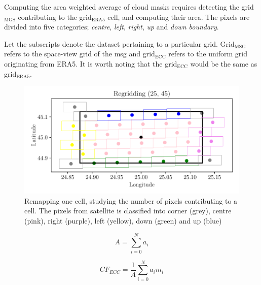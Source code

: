 Computing the area weighted average of cloud masks requires detecting the grid$_{\text{MGS}}$ contributing to the grid$_{\text{ERA5}}$ cell, and computing their area. The pixels are divided into five categories; \textit{centre}, \textit{left}, \textit{right}, \textit{up} and \textit{down boundary}. 

Let the subscripts denote the dataset pertaining to a particular grid. Grid$_{\text{MSG}}$ refers to the space-view grid of the \acrlong{msg} and grid$_{\text{ECC}}$ refers to the uniform grid originating from ERA5. It is worth noting that the grid$_{\text{ECC}}$ would be the same as grid$_{\text{ERA5}}$.
\begin{figure}
    \centering
    \includegraphics{python_figs/example_remapping_lat45_lon25.pdf}
    \caption{Remapping one cell, studying the number of pixels contributing to a cell. The pixels from satellite is classified into corner (grey), centre (pink), right (purple), left (yellow), down (green) and up (blue) } 
    \label{fig:pixels_contributing_to_cell.}
\end{figure}

\begin{equation} \label{eq:tot_area}
    A = \sum_{i=0}^{N} a_i
\end{equation}

\begin{equation} \label{eq:area_weighting}
    CF_{ECC} = \frac{1}{A} \sum_{i=0}^{N} a_i m_i
\end{equation}

